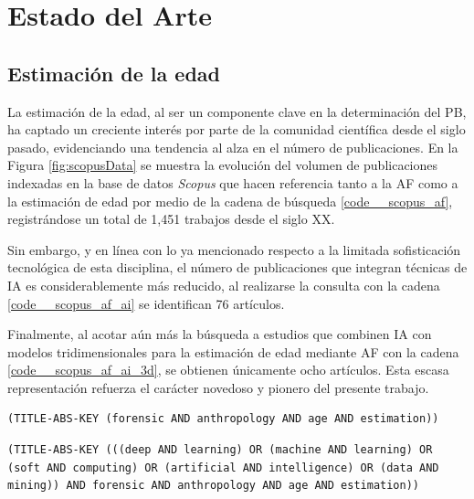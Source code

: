 \chapter{Estado del Arte}

\section{Estimación de la edad}
\label{traditional_labeling_methods}
La estimación de la edad, al ser un componente clave en la determinación del PB, ha captado un creciente interés por parte de la comunidad científica desde el siglo pasado, evidenciando una tendencia al alza en el número de publicaciones. En la Figura \ref{fig:scopusData} se muestra la evolución del volumen de publicaciones indexadas en la base de datos \textit{Scopus} que hacen referencia tanto a la AF como a la estimación de edad por medio de la cadena de búsqueda \ref{code__scopus_af}, registrándose un total de 1,451 trabajos desde el siglo XX.

Sin embargo, y en línea con lo ya mencionado respecto a la limitada sofisticación tecnológica de esta disciplina, el número de publicaciones que integran técnicas de IA es considerablemente más reducido, al realizarse la consulta con la cadena \ref{code__scopus_af_ai} se identifican 76 artículos.

Finalmente, al acotar aún más la búsqueda a estudios que combinen IA con modelos tridimensionales para la estimación de edad mediante AF con la cadena \ref{code__scopus_af_ai_3d}, se obtienen únicamente ocho artículos. Esta escasa representación refuerza el carácter novedoso y pionero del presente trabajo.

\begin{lstlisting}[caption={Cadena de búsqueda de \textit{Scopus} para obtener publicaciones de AF que referencian la estimación de la edad.}, captionpos=b, label=code__scopus_af, style=Consola]
(TITLE-ABS-KEY (forensic AND anthropology AND age AND estimation))
\end{lstlisting}
            
\begin{lstlisting}[caption={Cadena de búsqueda de \textit{Scopus} para obtener publicaciones de AF que referencian la estimación de la edad y hacen uso de alguna técnica de IA}, captionpos=b, label=code__scopus_af_ai, style=Consola]
(TITLE-ABS-KEY (((deep AND learning) OR (machine AND learning) OR (soft AND computing) OR (artificial AND intelligence) OR (data AND mining)) AND forensic AND anthropology AND age AND estimation))
\end{lstlisting}
            
